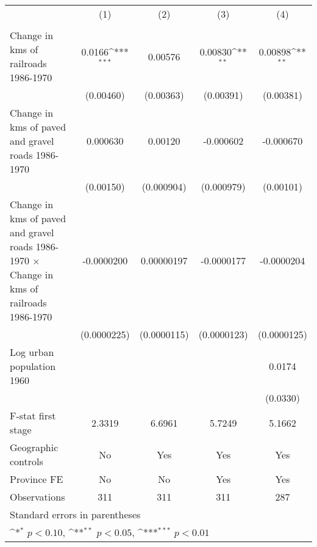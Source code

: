{
\def\sym#1{\ifmmode^{#1}\else\(^{#1}\)\fi}
\begin{tabular}{l*{4}{c}}
\hline\hline
                &\multicolumn{1}{c}{(1)}&\multicolumn{1}{c}{(2)}&\multicolumn{1}{c}{(3)}&\multicolumn{1}{c}{(4)}\\
                &\multicolumn{1}{c}{}&\multicolumn{1}{c}{}&\multicolumn{1}{c}{}&\multicolumn{1}{c}{}\\
\hline
Change in kms of railroads 1986-1970&   0.0166\sym{***}&  0.00576         &  0.00830\sym{**} &  0.00898\sym{**} \\
                &(0.00460)         &(0.00363)         &(0.00391)         &(0.00381)         \\
[1em]
Change in kms of paved and gravel roads 1986-1970& 0.000630         &  0.00120         &-0.000602         &-0.000670         \\
                &(0.00150)         &(0.000904)         &(0.000979)         &(0.00101)         \\
[1em]
Change in kms of paved and gravel roads 1986-1970 $\times$ Change in kms of railroads 1986-1970&-0.0000200         &0.00000197         &-0.0000177         &-0.0000204         \\
                &(0.0000225)         &(0.0000115)         &(0.0000123)         &(0.0000125)         \\
[1em]
Log urban population 1960&                  &                  &                  &   0.0174         \\
                &                  &                  &                  & (0.0330)         \\
\hline
F-stat first stage&   2.3319         &   6.6961         &   5.7249         &   5.1662         \\
Geographic controls&       No         &      Yes         &      Yes         &      Yes         \\
Province FE     &       No         &       No         &      Yes         &      Yes         \\
Observations    &      311         &      311         &      311         &      287         \\
\hline\hline
\multicolumn{5}{l}{\footnotesize Standard errors in parentheses}\\
\multicolumn{5}{l}{\footnotesize \sym{*} \(p<0.10\), \sym{**} \(p<0.05\), \sym{***} \(p<0.01\)}\\
\end{tabular}
}
